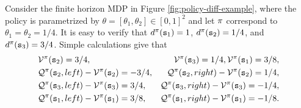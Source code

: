 \begin{example}\label{example:policy_diff}
    Consider the finite horizon MDP in Figure \ref{fig:policy-diff-example}, where the policy is parametrized by $\theta = [\theta_1,\theta_2]\in [0,1]^2$ and let ${\pi}$ correspond to $\theta_1=\theta_2=1/4$. It is easy to verify that $d^{\pi}({\tt s}_1) = 1$, $d^{\pi}({\tt s}_2) = 1/4$, and $d^{\pi}({\tt s}_3) = 3/4$. Simple calculations give that
    \begin{align*}
            &\mathcal{V}^{\pi}({\tt s}_2)=3/4, &\mathcal{V}^{\pi}({\tt s}_3)=1/4, 
            \mathcal{V}^{\pi}({\tt s}_1)=3/8,\\
            &\mathcal{Q}^{\pi}({\tt s}_2, left) - \mathcal{V}^{\pi}({\tt s}_2) = -3/4, 
            &\mathcal{Q}^{\pi}({\tt s}_2, right) - \mathcal{V}^{\pi}({\tt s}_2) = 1/4, \\
            &\mathcal{Q}^{\pi}({\tt s}_3, left) - \mathcal{V}^{\pi}({\tt s}_3) = 3/4, 
            &\mathcal{Q}^{\pi}({\tt s}_3, right) - \mathcal{V}^{\pi}({\tt s}_3) = -1/4, \\
            &\mathcal{Q}^{\pi}({\tt s}_1, left) - \mathcal{V}^{\pi}({\tt s}_1) = 3/8, 
            &\mathcal{Q}^{\pi}({\tt s}_1, right) - \mathcal{V}^{\pi}({\tt s}_1) = -1/8. 
    \end{align*}


\end{example}
